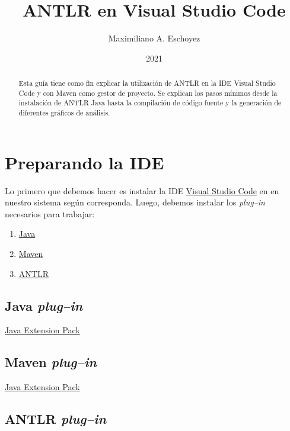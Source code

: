 \documentclass[a5paper,10pt]{article}
\author{Maximiliano A. Eschoyez}
\title{ANTLR en Visual Studio Code}
\date{2021}
\begin{document}
\maketitle


\begin{abstract}
	Esta guía tiene como fin explicar la utilización de ANTLR en la IDE Visual Studio Code y con Maven como gestor de proyecto.  Se explican los pasos mínimos desde la instalación de ANTLR Java hasta la compilación de código fuente y la generación de diferentes gráficos de análisis.
\end{abstract}

\section{Preparando la IDE}
\label{intro}

Lo primero que debemos hacer es instalar la IDE \href{https://code.visualstudio.com/}{Visual Studio Code} en en nuestro sistema según corresponda. Luego, debemos instalar los \emph{plug--in} necesarios para trabajar:
\begin{enumerate}
	\item \hyperref[pluginJava]{Java}
	\item \hyperref[pluginMaven]{Maven}
	\item \hyperref[pluginANTLR]{ANTLR}
\end{enumerate}

\subsection{Java \emph{plug--in}}
\label{pluginJava}

\href{https://marketplace.visualstudio.com/items?itemName=vscjava.vscode-java-pack}{Java Extension Pack}

\subsection{Maven \emph{plug--in}}
\label{pluginMaven}

\href{https://marketplace.visualstudio.com/items?itemName=vscjava.vscode-java-pack}{Java Extension Pack}

\subsection{ANTLR \emph{plug--in}}
\label{pluginANTLR}
\end{document}
